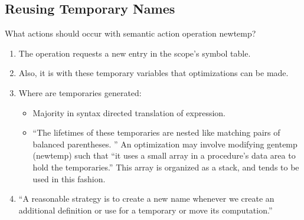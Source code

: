 \documentclass[11pt]{article}
\begin{document}
\subsection {Reusing Temporary Names}
What actions should occur with semantic action operation newtemp?  
\begin{enumerate}
\item The operation requests a new entry in the scope's symbol table.    
\item Also, it is with these temporary variables that optimizations can be made.  
\item Where are temporaries generated:
\begin{itemize}
\item Majority in syntax directed translation of expression.  
\item ``The lifetimes of these temporaries are nested like matching pairs of balanced parentheses.  ''    An optimization may involve modifying gentemp (newtemp) such that ``it uses a small array in a procedure's data area to hold the temporaries.''   This array is organized as a stack, and tends to be used in this fashion.  
\end{itemize}
\item ``A reasonable strategy is to create a new name whenever we create an additional definition or use for a temporary or move its computation.''   
\end{enumerate}


\newpage
\end{document}
